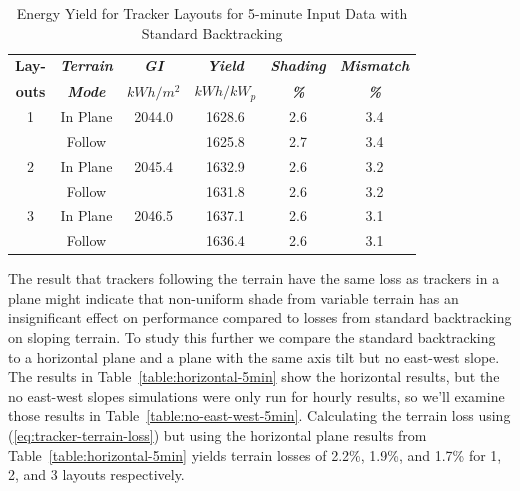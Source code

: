 \documentclass[conference]{IEEEtran}
\begin{document}
\begin{table}[htbp]
\caption{Energy Yield for Tracker Layouts for 5-minute Input Data with Standard Backtracking}
\begin{center}
\begin{tabular}{|c|c|c|c|c|c|}
\hline
\textbf{Lay-}& \textbf{\textit{Terrain}}& \textbf{\textit{GI}}&        \textbf{\textit{Yield}}&        \textbf{\textit{Shading}}& \textbf{\textit{Mismatch}} \\
\textbf{outs}& \textbf{\textit{Mode}}&    \textbf{\textit{$kWh/m^2$}}& \textbf{\textit{$kWh / kW_p$}}& \textbf{\textit{\%}}&      \textbf{\textit{\%}} \\
\hline
1& In Plane& 2044.0&  1628.6& 2.6& 3.4 \\
 & Follow&         &  1625.8& 2.7& 3.4 \\
\hline
2& In Plane& 2045.4&  1632.9& 2.6& 3.2 \\
 & Follow&         &  1631.8& 2.6& 3.2 \\
\hline
3& In Plane& 2046.5&  1637.1& 2.6& 3.1 \\
 & Follow&         &  1636.4& 2.6& 3.1 \\
\hline
\end{tabular}
\label{table:standard-5min}
\end{center}
\end{table}

The result that trackers following the terrain have the same loss as trackers in a plane might indicate that non-uniform shade from variable terrain has an insignificant effect on performance compared to losses from standard backtracking on sloping terrain. To study this further we compare the standard backtracking to a horizontal plane and a plane with the same axis tilt but no east-west slope. The results in Table~\ref{table:horizontal-5min} show the horizontal results, but the no east-west slopes simulations were only run for hourly results, so we'll examine those results in Table~\ref{table:no-east-west-5min}. Calculating the terrain loss using (\ref{eq:tracker-terrain-loss}) but using the horizontal plane results from Table~\ref{table:horizontal-5min} yields terrain losses of 2.2\%, 1.9\%, and 1.7\% for 1, 2, and 3 layouts respectively.
\end{document}
